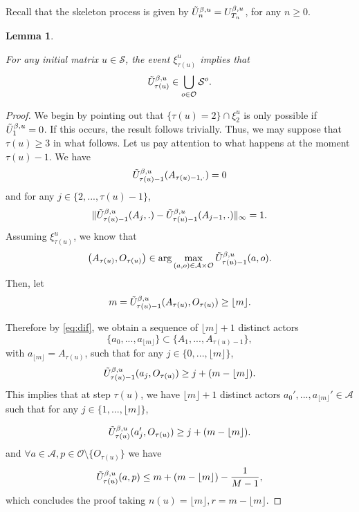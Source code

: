 \documentclass[11pt]{article}
\newtheorem{lemma}[theorem]{Lemma}
\theoremstyle{definition}
\newcommand{\st}{\mathcal{S}}
\begin{document}
Recall that the skeleton process is given by $\Tilde{U}_n^{\beta, u}=U_{T_n}^{\beta, u}$, for any $n\geq 0$.

\begin{lemma}\label{appendix_lemma1}

For any initial matrix $u\in\st$, the event $\xi_{\tau(u)}^u$ implies that 
$$
    \Tilde{U}^{\beta,u}_{\tau(u)}\in\bigcup_{o\in\mathcal{O}}\st^o.
$$
    
\end{lemma}

\begin{proof}
    We begin by pointing out that $\{\tau(u)=2\}\cap\xi_2^u$ is only possible if $\Tilde{U}^{\beta,u}_1=0$. If this occurs, the result follows trivially. 
    Thus, we may suppose that $\tau(u)\geq 3$ in what follows. Let us pay attention to what happens at the moment $\tau(u)-1$. We have $$
\Tilde{U}^{\beta,u}_{\tau(u)-1}(A_{\tau(u)-1,\cdot})=0
    $$
    and for any $j\in\{2,...,\tau(u)-1\}$,
    \begin{equation} \label{eq:dif}
\|\Tilde{U}^{\beta,u}_{\tau(u)-1}(A_{j}, .)-\Tilde{U}^{\beta,u}_{\tau(u)-1}(A_{j-1},.)\|_\infty=1.        
    \end{equation}
    Assuming $\xi_{\tau(u)}^u$, we know that 
    $$
\left(A_{\tau(u)},O_{\tau(u)}\right)\in\arg\max_{(a,o)\in\mathcal{A}\times\mathcal{O}}\Tilde{U}^{\beta,u}_{\tau(u)-1}(a,o).
    $$
    Then, let
    $$
        m=\Tilde{U}^{\beta,u}_{\tau(u)-1}(A_{\tau(u)},O_{\tau(u)})\geq \lfloor m \rfloor.
    $$
    
    Therefore by \eqref{eq:dif}, we obtain a sequence of $\lfloor m \rfloor+1$ distinct actors
    $$
        \{a_0,...,a_{\lfloor m \rfloor}\}\subset\{A_1,...,A_{\tau(u)-1}\},
    $$
    with $a_{\lfloor m \rfloor}=A_{\tau(u)} $, such that for any $j\in\{0,...,\lfloor m \rfloor\}$,
    $$
        \Tilde{U}^{\beta,u}_{\tau(u)-1}(a_j,O_{\tau(u)})\geq j+(m-\lfloor m \rfloor).
    $$
This implies that at step $\tau(u)$, we have $\lfloor m \rfloor+1$ distinct actors $a_0',...,a_{\lfloor m \rfloor}'\in\mathcal{A}$ such that for any $j\in\{1,...,\lfloor m \rfloor\}$,
    
    $$
        \Tilde{U}^{\beta,u}_{\tau(u)}(a_j',O_{\tau(u)})\geq j+(m-\lfloor m \rfloor).
    $$
    and $\forall a\in\mathcal{A},p\in\mathcal{O}\setminus\{O_{\tau(u)}\}$ we have
    $$
        \Tilde{U}^{\beta,u}_{\tau(u)}(a,p)\leq m+(m-\lfloor m \rfloor)-\frac{1}{M-1},
    $$
    which concludes the proof taking $n(u) =\lfloor m \rfloor, r = m-\lfloor m \rfloor$.
\end{proof}
 
\end{document}
